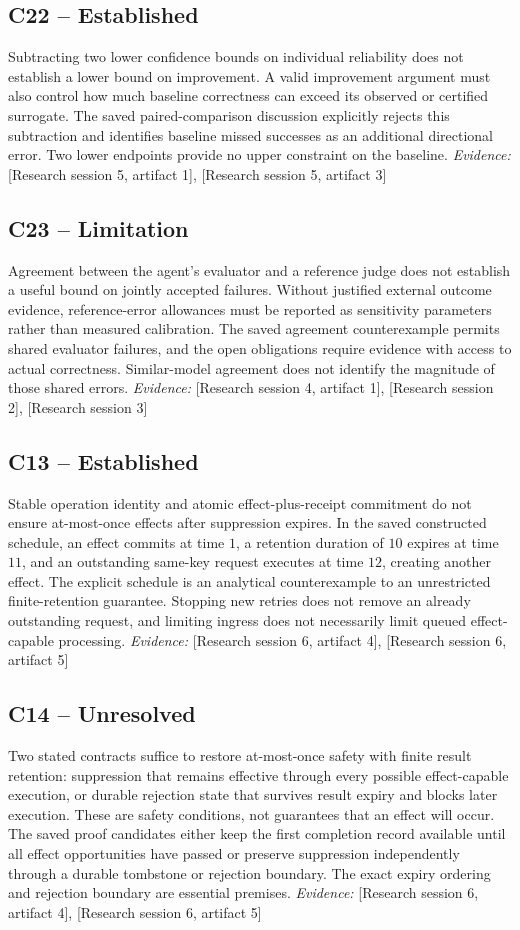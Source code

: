 \documentclass[11pt]{article}
\begin{document}
\begin{sloppypar}
\subsection{C22 -- Established}
Subtracting two lower confidence bounds on individual reliability does not establish a lower bound on improvement. A valid improvement argument must also control how much baseline correctness can exceed its observed or certified surrogate.
The saved paired-comparison discussion explicitly rejects this subtraction and identifies baseline missed successes as an additional directional error. Two lower endpoints provide no upper constraint on the baseline.
\textit{Evidence: }[Research session 5, artifact 1], [Research session 5, artifact 3]
\subsection{C23 -- Limitation}
Agreement between the agent's evaluator and a reference judge does not establish a useful bound on jointly accepted failures. Without justified external outcome evidence, reference-error allowances must be reported as sensitivity parameters rather than measured calibration.
The saved agreement counterexample permits shared evaluator failures, and the open obligations require evidence with access to actual correctness. Similar-model agreement does not identify the magnitude of those shared errors.
\textit{Evidence: }[Research session 4, artifact 1], [Research session 2], [Research session 3]
\subsection{C13 -- Established}
Stable operation identity and atomic effect-plus-receipt commitment do not ensure at-most-once effects after suppression expires. In the saved constructed schedule, an effect commits at time $1$, a retention duration of $10$ expires at time $11$, and an outstanding same-key request executes at time $12$, creating another effect.
The explicit schedule is an analytical counterexample to an unrestricted finite-retention guarantee. Stopping new retries does not remove an already outstanding request, and limiting ingress does not necessarily limit queued effect-capable processing.
\textit{Evidence: }[Research session 6, artifact 4], [Research session 6, artifact 5]
\subsection{C14 -- Unresolved}
Two stated contracts suffice to restore at-most-once safety with finite result retention: suppression that remains effective through every possible effect-capable execution, or durable rejection state that survives result expiry and blocks later execution. These are safety conditions, not guarantees that an effect will occur.
The saved proof candidates either keep the first completion record available until all effect opportunities have passed or preserve suppression independently through a durable tombstone or rejection boundary. The exact expiry ordering and rejection boundary are essential premises.
\textit{Evidence: }[Research session 6, artifact 4], [Research session 6, artifact 5]

\end{sloppypar}
\end{document}

